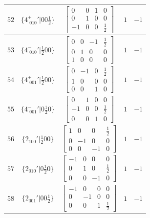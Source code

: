 \documentclass[fleqn,8pt]{jsarticle}
\begin{document}
\begin{longtable}{ccccc}
$ 52 $ & $ \{4^{+}_{\,\,010}{}'|0 0 \frac{1}{2}\} $ & $ \begin{bmatrix} 0 & 0 & 1 & 0 \\ 0 & 1 & 0 & 0 \\ -1 & 0 & 0 & \frac{1}{2} \end{bmatrix} $ & $ 1 $ & $ -1 $ \\ \hline
$ 53 $ & $ \{4^{-}_{\,\,010}{}'|\frac{1}{2} 0 0\} $ & $ \begin{bmatrix} 0 & 0 & -1 & \frac{1}{2} \\ 0 & 1 & 0 & 0 \\ 1 & 0 & 0 & 0 \end{bmatrix} $ & $ 1 $ & $ -1 $ \\ \hline
$ 54 $ & $ \{4^{+}_{\,\,001}{}'|\frac{1}{2} 0 0\} $ & $ \begin{bmatrix} 0 & -1 & 0 & \frac{1}{2} \\ 1 & 0 & 0 & 0 \\ 0 & 0 & 1 & 0 \end{bmatrix} $ & $ 1 $ & $ -1 $ \\ \hline
$ 55 $ & $ \{4^{-}_{\,\,001}{}'|0 \frac{1}{2} 0\} $ & $ \begin{bmatrix} 0 & 1 & 0 & 0 \\ -1 & 0 & 0 & \frac{1}{2} \\ 0 & 0 & 1 & 0 \end{bmatrix} $ & $ 1 $ & $ -1 $ \\ \hline
$ 56 $ & $ \{2{}_{100}{}'|\frac{1}{2} 0 0\} $ & $ \begin{bmatrix} 1 & 0 & 0 & \frac{1}{2} \\ 0 & -1 & 0 & 0 \\ 0 & 0 & -1 & 0 \end{bmatrix} $ & $ 1 $ & $ -1 $ \\ \hline
$ 57 $ & $ \{2{}_{010}{}'|0 \frac{1}{2} 0\} $ & $ \begin{bmatrix} -1 & 0 & 0 & 0 \\ 0 & 1 & 0 & \frac{1}{2} \\ 0 & 0 & -1 & 0 \end{bmatrix} $ & $ 1 $ & $ -1 $ \\ \hline
$ 58 $ & $ \{2{}_{001}{}'|0 0 \frac{1}{2}\} $ & $ \begin{bmatrix} -1 & 0 & 0 & 0 \\ 0 & -1 & 0 & 0 \\ 0 & 0 & 1 & \frac{1}{2} \end{bmatrix} $ & $ 1 $ & $ -1 $ \\ \hline

\end{longtable}
\end{document}
